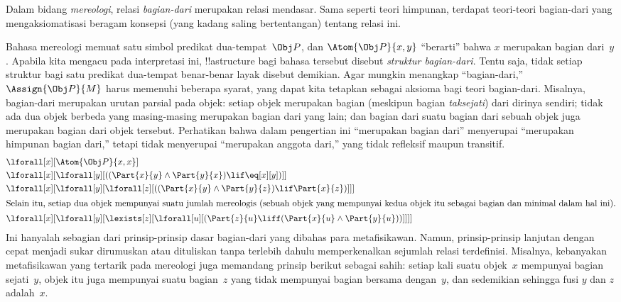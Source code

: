 \documentclass[../../../include/open-logic-section]{subfiles}
\begin{document}
\begin{ex}
Dalam bidang \emph{mereologi}, relasi \emph{bagian-dari} merupakan relasi
mendasar. Sama seperti teori himpunan, terdapat teori-teori bagian-dari yang
mengaksiomatisasi beragam konsepsi (yang kadang saling bertentangan) tentang
relasi ini.

Bahasa mereologi memuat satu simbol predikat dua-tempat~$\Obj P$, dan
$\Atom{\Obj P}{x, y}$ ``berarti'' bahwa $x$ merupakan bagian dari~$y$. Apabila
kita mengacu pada interpretasi ini, !!a{structure} bagi bahasa tersebut
disebut \emph{struktur bagian-dari}. Tentu saja, tidak setiap struktur bagi
satu predikat dua-tempat benar-benar layak disebut demikian. Agar mungkin
menangkap ``bagian-dari,'' $\Assign{\Obj P}{M}$ harus memenuhi beberapa syarat,
yang dapat kita tetapkan sebagai aksioma bagi teori bagian-dari. Misalnya,
bagian-dari merupakan urutan parsial pada objek: setiap objek merupakan bagian
(meskipun bagian \emph{taksejati}) dari dirinya sendiri; tidak ada dua objek
berbeda yang masing-masing merupakan bagian dari yang lain; dan bagian dari
suatu bagian dari sebuah objek juga merupakan bagian dari objek tersebut.
Perhatikan bahwa dalam pengertian ini ``merupakan bagian dari'' menyerupai
``merupakan himpunan bagian dari,'' tetapi tidak menyerupai ``merupakan anggota
dari,'' yang tidak refleksif maupun transitif.
\begin{align*}
& \lforall[x][\Atom{\Obj P}{x,x}] \\
& \lforall[x][\lforall[y][((\Part{x}{y} \land \Part{y}{x})
      \lif \eq[x][y])]] \\
& \lforall[x][\lforall[y][\lforall[z][((\Part{x}{y} \land
        \Part{y}{z}) \lif \Part{x}{z})]]]\\
\intertext{Selain itu, setiap dua objek mempunyai suatu jumlah mereologis
  (sebuah objek yang mempunyai kedua objek itu sebagai bagian dan minimal
  dalam hal ini).}  &
\lforall[x][\lforall[y][\lexists[z][\lforall[u][(\Part{z}{u} \liff
        (\Part{x}{u} \land \Part{y}{u}))]]]]
\end{align*}
Ini hanyalah sebagian dari prinsip-prinsip dasar bagian-dari yang dibahas para
metafisikawan. Namun, prinsip-prinsip lanjutan dengan cepat menjadi sukar
dirumuskan atau dituliskan tanpa terlebih dahulu memperkenalkan sejumlah
relasi terdefinisi. Misalnya, kebanyakan metafisikawan yang tertarik pada
mereologi juga memandang prinsip berikut sebagai sahih: setiap kali suatu
objek~$x$ mempunyai bagian sejati~$y$, objek itu juga mempunyai suatu
bagian~$z$ yang tidak mempunyai bagian bersama dengan~$y$, dan sedemikian
sehingga fusi $y$ dan $z$ adalah~$x$.
\end{ex}
\end{document}
